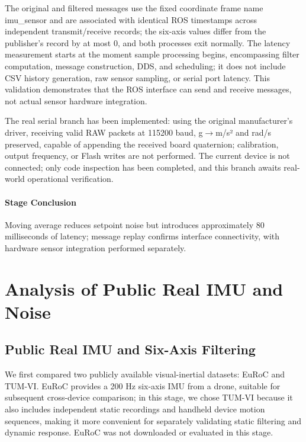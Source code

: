The original and filtered messages use the fixed coordinate frame name imu\_sensor and are associated with identical ROS timestamps across independent transmit/receive records; the six-axis values differ from the publisher's record by at most 0, and both processes exit normally. The latency measurement starts at the moment sample processing begins, encompassing filter computation, message construction, DDS, and scheduling; it does not include CSV history generation, raw sensor sampling, or serial port latency. This validation demonstrates that the ROS interface can send and receive messages, not actual sensor hardware integration.

The real serial branch has been implemented: using the original manufacturer's driver, receiving valid RAW packets at 115200 baud, g\(\rightarrow\)m/s² and rad/s preserved, capable of appending the received board quaternion; calibration, output frequency, or Flash writes are not performed. The current device is not connected; only code inspection has been completed, and this branch awaits real-world operational verification.


\paragraph{Stage Conclusion} Moving average reduces setpoint noise but introduces approximately 80 milliseconds of latency; message replay confirms interface connectivity, with hardware sensor integration performed separately.


\FloatBarrier

\section{Analysis of Public Real IMU and Noise}

\label{stage:s07}

\subsection{Public Real IMU and Six-Axis Filtering}\label{s07-detail-1}

We first compared two publicly available visual-inertial datasets: EuRoC and TUM-VI. EuRoC provides a 200 Hz six-axis IMU from a drone, suitable for subsequent cross-device comparison; in this stage, we chose TUM-VI because it also includes independent static recordings and handheld device motion sequences, making it more convenient for separately validating static filtering and dynamic response. EuRoC was not downloaded or evaluated in this stage.

